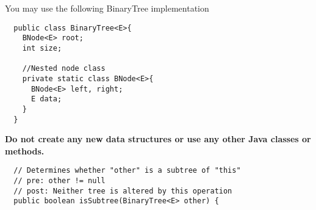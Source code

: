 \documentclass[12pt,letter]{article}
\begin{document}
\vspace{4pt}
\noindent You may use the following BinaryTree implementation

\begin{verbatim}
  public class BinaryTree<E>{
    BNode<E> root;
    int size;

    //Nested node class
    private static class BNode<E>{
      BNode<E> left, right;
      E data;
    }
  }
\end{verbatim}

\noindent \textbf{Do not create any new data structures or use any other Java classes or methods.}

\clearpage
\begin{verbatim}
  // Determines whether "other" is a subtree of "this"
  // pre: other != null
  // post: Neither tree is altered by this operation
  public boolean isSubtree(BinaryTree<E> other) {
\end{verbatim}
\end{document}
